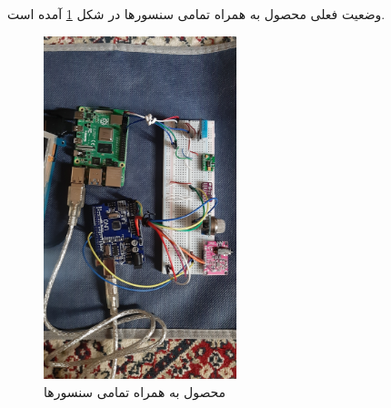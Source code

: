 وضعیت فعلی محصول به همراه تمامی سنسور‌ها در شکل \ref{fig:10} آمده است.


\begin{figure}[h]
	\centering
	\includegraphics[width=0.5\textwidth]{figs/all.jpg}
	
	\caption{محصول به همراه تمامی سنسور‌ها }
	\label{fig:10}
\end{figure}